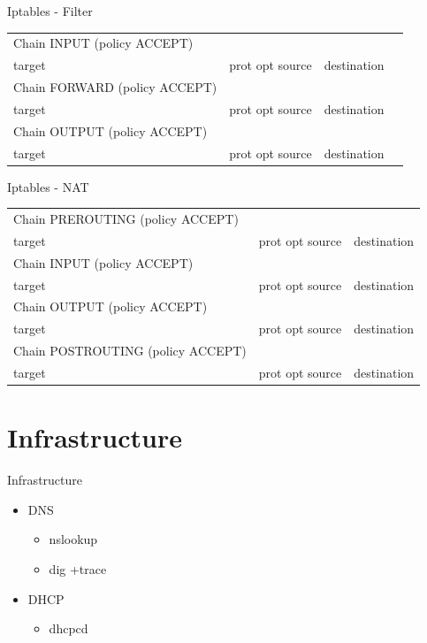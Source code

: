 \documentclass[aspectratio=169,10pt,t]{beamer}
\begin{document}
\begin{frame}[t]{Iptables - Filter}{\phantom{(y)}}
	\vfill
	\center
	\begin{tabular}{*{4}{l}}
		Chain INPUT (policy ACCEPT)&&&\\
		target&prot opt source&destination&\\

		Chain FORWARD (policy ACCEPT)\\
		target&prot opt source&destination&\\

		Chain OUTPUT (policy ACCEPT)\\
		target&prot opt source&destination&\\
	\end{tabular}
	\vfill

	
\end{frame}
\begin{frame}[t]{Iptables - NAT}{\phantom{(y)}}
	\vfill
	\center
	\begin{tabular}{*{3}{l}}
		Chain PREROUTING (policy ACCEPT)\\
		target&prot opt source&destination\\

		Chain INPUT (policy ACCEPT)\\
		target&prot opt source&destination\\

		Chain OUTPUT (policy ACCEPT)\\
		target&prot opt source&destination\\

		Chain POSTROUTING (policy ACCEPT)\\
		target&prot opt source&destination
	\end{tabular}
	\vfill
	
\end{frame}

\section{Infrastructure}%
\label{sec:routing}


\begin{frame}[t]{Infrastructure}{\phantom{(y)}}
	\begin{itemize}
		\item DNS
			\begin{itemize}
				\item nslookup
				\item dig +trace
			\end{itemize}
		\item DHCP
			\begin{itemize}
				\item dhcpcd
			\end{itemize}
	\end{itemize}
\end{frame}
\end{document}

